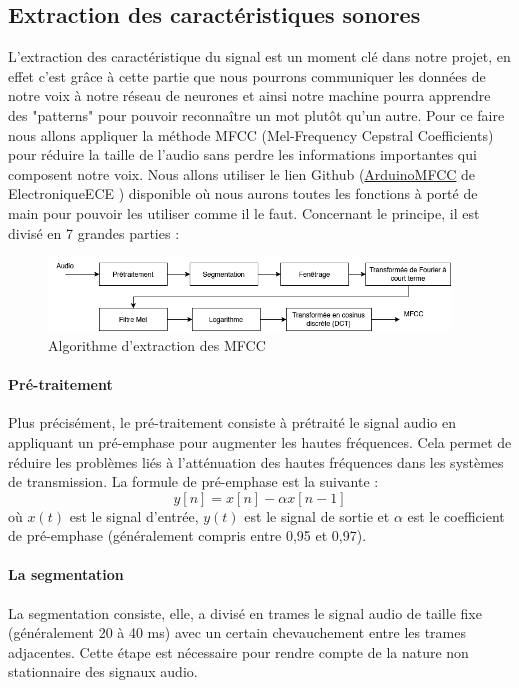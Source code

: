 \documentclass[a4paper,11pt]{article}
\begin{document}
\subsection{Extraction des caractéristiques sonores} \label{mfcc}

L'extraction des caractéristique du signal est un moment clé dans notre projet, en effet c'est grâce à cette partie que nous pourrons communiquer les données de notre voix à notre réseau de neurones et ainsi notre machine pourra apprendre des "patterns" pour pouvoir reconnaître un mot plutôt qu'un autre. Pour ce faire nous allons appliquer la méthode MFCC (Mel-Frequency Cepstral Coefficients) pour réduire la taille de l'audio sans perdre les informations importantes qui composent notre voix. Nous allons utiliser le lien Github (\href{https://github.com/ElectroniqueECE/ArduinoMFCC}{ArduinoMFCC} de ElectroniqueECE \cite{algoMFCC}) disponible où nous aurons toutes les fonctions à porté de main pour pouvoir les utiliser comme il le faut. Concernant le principe, il est divisé en 7 grandes parties : 
\begin{center}
\begin{figure} [H]
	\centering
	\includegraphics[width=0.95\textwidth]{images/mfcc.png}
	\caption{Algorithme d'extraction des MFCC}
\end{figure}
\end{center}
\paragraph{Pré-traitement}
Plus précisément, le pré-traitement consiste à prétraité le signal audio en appliquant un pré-emphase pour augmenter les hautes fréquences. Cela permet de réduire les problèmes liés à l'atténuation des hautes fréquences dans les systèmes de transmission. La formule de pré-emphase est la suivante :
\[
y[n] = x[n] - \alpha x[n-1]
\]
où $x(t)$ est le signal d'entrée, $y(t)$ est le signal de sortie et $\alpha$ est le coefficient de pré-emphase (généralement compris entre 0,95 et 0,97). 
\paragraph{La segmentation}
La segmentation consiste, elle, a divisé en trames le signal audio de taille fixe (généralement 20 à 40 ms) avec un certain chevauchement entre les trames adjacentes. Cette étape est nécessaire pour rendre compte de la nature non stationnaire des signaux audio.
\end{document}
